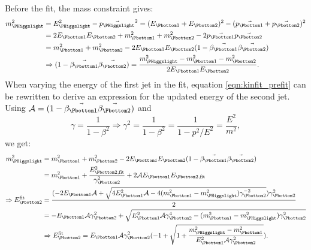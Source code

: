 Before the fit, the mass constraint gives:
~\vspace{-0.5\baselineskip}
\begin{align}\label{eqn:kinfit_prefit}
m_{\PHiggslight}^2 &= E_{\PHiggslight}^2 - \vec{p_{\PHiggslight}}^2 = (E_{\Pbottom 1}+E_{\Pbottom 2})^2 - (\vec{p_{\Pbottom 1}} + \vec{p_{\Pbottom 2}})^2 \notag\\
& = 2E_{\Pbottom 1}E_{\Pbottom 2} + m_{\Pbottom 1}^2 +m_{\Pbottom 2}^2 - 2\vec{p_{\Pbottom 1}}\vec{p_{\Pbottom 2}} \notag\\
& = m_{\Pbottom 1}^2 +m_{\Pbottom 2}^2 - 2E_{\Pbottom 1}E_{\Pbottom 2}(1-\vec{\beta_{\Pbottom 1}}\vec{\beta_{\Pbottom 2}})\notag\\
&\Rightarrow (1-\vec{\beta_{\Pbottom 1}}\vec{\beta_{\Pbottom 2}}) = \frac{m_{\PHiggslight}^2 - m_{\Pbottom 1}^2 - m_{\Pbottom 2}^2}{2E_{\Pbottom 1}E_{\Pbottom 2}}.
\end{align}
When varying the energy of the first jet in the fit, equation \ref{eqn:kinfit_prefit} can be 
rewritten to derive an expression for the updated energy of the second jet. Using $\mathcal{A} = (1-\vec{\beta_{\Pbottom 1}}\vec{\beta_{\Pbottom 2}})$ 
and
~\vspace{-0.5\baselineskip}
\begin{equation}\label{eqn:gamma_def}
\gamma = \frac{1}{1-\beta^2} \Rightarrow \gamma^2 = \frac{1}{1-\beta^2} = \frac{1}{1-p^2/E^2} = \frac{E^2}{m^2},
\end{equation}
we get:
~\vspace{-0.5\baselineskip}
\begin{align}\label{eqn:kinfit_variation}
m_{\PHiggslight}^2 &= m_{\Pbottom 1}^2 + m_{\Pbottom 2}^2 - 2E_{\Pbottom 1}E_{\Pbottom 2}(1-\vec{\beta_{\Pbottom 1}}\vec{\beta_{\Pbottom 2}})\notag\\
&= m_{\Pbottom 1}^2 +\frac{E_{\Pbottom 2,\text{fit}}^2}{\gamma_{\Pbottom 2}^2} +2\mathcal{A}E_{\Pbottom 1}E_{\Pbottom 2,\text{fit}}\notag\\
\Rightarrow E_{\Pbottom 2}^{\text{fit}}& = \frac{(-2E_{\Pbottom 1}\mathcal{A} + \sqrt{4E_{\Pbottom 1}^2\mathcal{A} - 4(m_{\Pbottom 1}^2-m_{\PHiggslight}^2)\gamma_{\Pbottom 2}^{-2}})\gamma_{\Pbottom 2}^2}{2}\notag\\
&= - E_{\Pbottom 1}\mathcal{A}\gamma_{\Pbottom 2}^2+\sqrt{E_{\Pbottom 1}^2\mathcal{A}\gamma_{\Pbottom 2}^4 - (m_{\Pbottom 1}^2 - m_{\PHiggslight}^2)\gamma_{\Pbottom 2}^2}\notag\\
&\Rightarrow E_{\Pbottom 2}^{\text{fit}} = E_{\Pbottom 1}\mathcal{A}\gamma_{\Pbottom 2}^2(-1 + \sqrt{1+\frac{m_{\PHiggslight}^2 - m_{\Pbottom 1}^2}{E_{\Pbottom 1}^2\mathcal{A}\gamma_{\Pbottom 2}^2}}).
\end{align}


